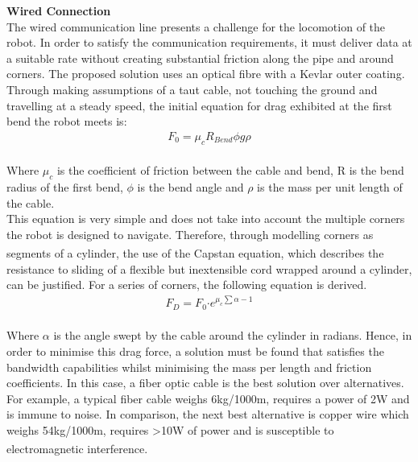 \documentclass[11pt]{article}		%
\newcommand{\supercite}[1]{\textsuperscript{\cite{#1}}}		%
\begin{document}
            \textbf{Wired Connection}
	        \\
	        The wired communication line presents a challenge for the locomotion of the robot. 
	        In order to satisfy the communication requirements, it must deliver data at a suitable rate without creating substantial friction along the pipe and around corners. 
	        The proposed solution uses an optical fibre with a Kevlar outer coating. 
	        Through making assumptions of a taut cable, not touching the ground and travelling at a steady speed, the initial equation for drag exhibited at the first bend the robot meets is: 
	        \begin{align}
					F_0 = \mu_c R_{Bend} \phi g \rho
			\end{align}
	        \\
            \hspace*{2ex}Where $\mu_c$ is the coefficient of friction between the cable and bend, R is the bend radius of the first bend, $\phi$ is the bend angle and $\rho$ is the mass per unit length of the cable.
	        \\
            \hspace*{2ex}This equation is very simple and does not take into account the multiple corners the robot is designed to navigate.
	        Therefore, through modelling corners as segments of a cylinder, the use of the Capstan equation\supercite{capstan}, which describes the resistance to sliding of a flexible but inextensible cord wrapped around a cylinder, can be justified. 
	        For a series of corners, the following equation is derived.
	        \begin{align}
	                F_D = F_0 \boldsymbol{\cdot} {e}^{\mu_c \sum \alpha -1} \label{cableDrag}
	        \end{align}
	        \\
            \hspace*{2ex}Where $\alpha$ is the angle swept by the cable around the cylinder in radians. 
		    Hence, in order to minimise this drag force, a solution must be found that satisfies the bandwidth capabilities whilst minimising the mass per length and friction coefficients.  
		    In this case, a fiber optic cable is the best solution over alternatives. 
		    For example, a typical fiber cable weighs 6kg/1000m, requires a power of 2W and is immune to noise. 
		    In comparison, the next best alternative is copper wire which weighs 54kg/1000m, requires >10W of power and is susceptible to electromagnetic interference\supercite{wiring}.
\end{document}
